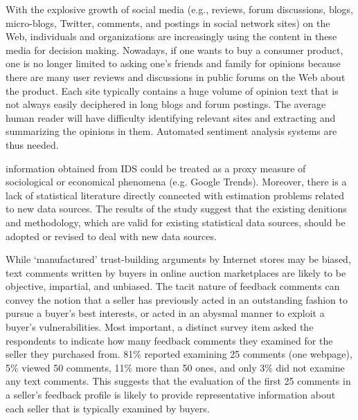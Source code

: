 \documentclass[a4paper, 11pt]{article}
\begin{document}
With the explosive growth of social media (e.g., reviews, forum discussions,
blogs, micro-blogs, Twitter, comments, and postings in social network sites)
on the Web, individuals and organizations are increasingly using the content
in these media for decision making. Nowadays, if one wants to buy a
consumer product, one is no longer limited to asking one’s friends and
family for opinions because there are many user reviews and discussions in
public forums on the Web about the product. 
Each site
typically contains a huge volume of opinion text that is not always easily
deciphered in long blogs and forum postings. The average human reader will
have difficulty identifying relevant sites and extracting and summarizing the
opinions in them. Automated sentiment analysis systems are thus needed.\cite{liu2012sentiment}

information obtained from IDS
could be treated as a proxy measure of sociological or economical phenomena (e.g. Google
Trends). Moreover, there is a lack of statistical literature directly connected with estimation
problems related to new data sources. The results of the study suggest that the existing denitions and methodology, which are
valid for existing statistical data sources, should be adopted or revised to deal with new data
sources. \cite{berkesewicz2015representativeness}

While ‘manufactured’ trust-building arguments by Internet stores may be biased, text comments written by buyers in online auction marketplaces are likely to be objective, impartial, and unbiased. The tacit nature of feedback comments can convey the notion that a seller has previously acted in an outstanding fashion to pursue a buyer’s best interests, or acted in an abysmal manner to exploit a buyer’s vulnerabilities.
Most important, a distinct survey item asked the respondents to indicate how many feedback comments they examined for the seller they purchased from. 81\% reported examining 25 comments (one webpage), 5\% viewed 50 comments, 11\% more than 50 ones, and only 3\% did not examine any text comments. This suggests that the evaluation of the first 25 comments in a seller’s feedback profile is likely to provide representative information about each seller that is typically examined by buyers. \cite{pavlou2006institutional,pavlou2006nature} 
\end{document}
